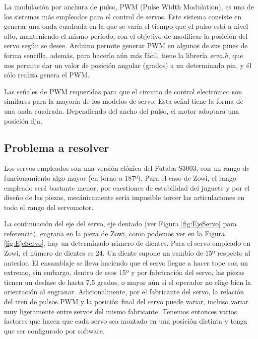 La modulación por anchura de pulso, PWM (Pulse Width Modulation), es una de los sistemas más empleados para el control de servos. Este sistema consiste en generar una onda cuadrada en la que se varía el tiempo que el pulso está a nivel alto, manteniendo el mismo período, con el objetivo de modificar la posición del servo según se desee. Arduino permite generar PWM en algunos de sus pines de forma sencilla, además, para hacerlo aún más fácil, tiene la librería \textit{srvo.h}, que nos permite dar un valor de posición angular (grados) a un determinado pin, y él sólo realiza genera el PWM.

Las señales de PWM requeridas para que el circuito de control electrónico son similares para la mayoría de los modelos de servo. Esta señal tiene la forma de una onda cuadrada. Dependiendo del ancho del pulso, el motor adoptará una posición fija.

\subsection{Problema a resolver}
Los servos empleados son una versión clónica del Futaba S3003, con un rango de funcionamiento algo mayor (en torno a 187º). Para el caso de Zowi, el rango empleado será bastante menor, por cuestiones de estabilidad del juguete y por el diseño de las piezas, mecánicamente sería imposible torcer las articulaciones en todo el rango del servomotor.

La continuación del eje del servo, eje dentado (ver Figura \ref{fig:EjeServo} para referencia), engrana en la pieza de Zowi, como podemos ver en la Figura \ref{fig:EjeServo}, hay un determinado número de dientes. Para el servo empleado en Zowi, el número de dientes es 24. Un diente supone un cambio de 15º respecto al anterior. El ensamblaje se lleva haciendo que el servo llegue a hacer tope con un extremo, sin embargo, dentro de esos 15º y por fabricación del servo, las piezas tienen un desfase de hasta 7.5 grados, o mayor aún si el operador no elige bien la orientación al engranar. Adicionalmente, por el fabricante del servo, la relación del tren de pulsos PWM y la posición final del servo puede variar, incluso variar muy ligeramente entre servos del mismo fabricante. Tenemos entonces varios factores que hacen que cada servo sea montado en una posición distinta y tenga que ser configurado por software.

